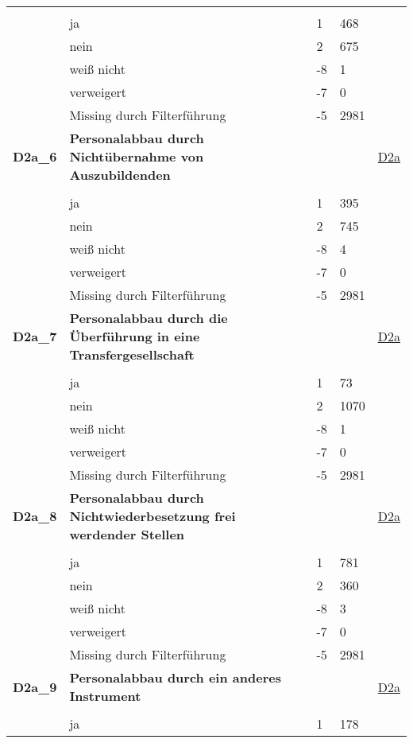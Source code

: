 \begin{longtable}{| L{2.5cm} | L{8.25cm}| C{1.5cm} | R{1.25cm} | C{2.25cm} |  }
   &  &  &  &  \\ 
   & ja & 1 & 468 &  \\ 
   & nein & 2 & 675 &  \\ 
   & weiß nicht & -8 & 1 &  \\ 
   & verweigert & -7 & 0 &  \\ 
   & Missing durch Filterführung & -5 & 2981 &  \\ 
   \midrule
\textbf{D2a\_6}\label{var:suf:D2a:6} & \textbf{Personalabbau durch Nichtübernahme von Auszubildenden} &  &  & \hyperref[D2a]{D2a} \\ 
   &  &  &  &  \\ 
   & ja & 1 & 395 &  \\ 
   & nein & 2 & 745 &  \\ 
   & weiß nicht & -8 & 4 &  \\ 
   & verweigert & -7 & 0 &  \\ 
   & Missing durch Filterführung & -5 & 2981 &  \\ 
   \midrule
\textbf{D2a\_7}\label{var:suf:D2a:7} & \textbf{Personalabbau durch die Überführung in eine Transfergesellschaft} &  &  & \hyperref[D2a]{D2a} \\ 
   &  &  &  &  \\ 
   & ja & 1 & 73 &  \\ 
   & nein & 2 & 1070 &  \\ 
   & weiß nicht & -8 & 1 &  \\ 
   & verweigert & -7 & 0 &  \\ 
   & Missing durch Filterführung & -5 & 2981 &  \\ 
   \midrule
\textbf{D2a\_8}\label{var:suf:D2a:8} & \textbf{Personalabbau durch Nichtwiederbesetzung frei werdender Stellen} &  &  & \hyperref[D2a]{D2a} \\ 
   &  &  &  &  \\ 
   & ja & 1 & 781 &  \\ 
   & nein & 2 & 360 &  \\ 
   & weiß nicht & -8 & 3 &  \\ 
   & verweigert & -7 & 0 &  \\ 
   & Missing durch Filterführung & -5 & 2981 &  \\ 
   \midrule
\textbf{D2a\_9}\label{var:suf:D2a:9} & \textbf{Personalabbau durch ein anderes Instrument} &  &  & \hyperref[D2a]{D2a} \\ 
   &  &  &  &  \\ 
   & ja & 1 & 178 &  \\ 

\end{longtable}

